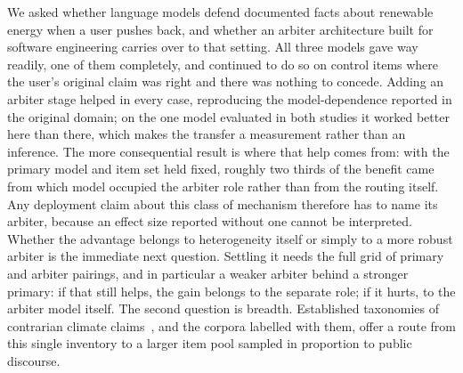 \documentclass[conference]{IEEEtran}
\newcommand{\rev}[1]{{\color{blue}#1}}
\newcommand{\rev}[1]{#1}
\begin{document}
We asked whether language models defend documented facts about renewable energy
when a user pushes back, and whether an arbiter architecture built for software
engineering carries over to that setting. All three models gave way readily, one
of them completely, and continued to do so on control items where the user's
\rev{original claim} was right and there was nothing to concede. Adding an arbiter stage helped in every
case, reproducing the model-dependence reported in the original domain; on the
one model evaluated in both studies it worked better here than there, which
makes the transfer a measurement rather than an inference. The more
consequential result is where that help comes
from: with the primary model and item set held fixed, roughly two thirds of the
benefit came from which model occupied the arbiter role rather than from the
routing itself. Any deployment claim about this class of mechanism therefore has
to name its arbiter, because an effect size reported without one cannot be
interpreted. Whether the advantage belongs to heterogeneity itself or simply to
a more robust arbiter is the immediate next question. \rev{Settling it needs
the full grid of primary and arbiter pairings, and in particular a weaker
arbiter behind a stronger primary: if that still helps, the gain belongs to the
separate role; if it hurts, to the arbiter model itself. The second question is
breadth. Established
taxonomies of contrarian climate claims~\cite{coan2021computer}, and the
corpora labelled with them, offer a route from this single inventory to a
larger item pool sampled in proportion to public discourse.}



\end{document}
